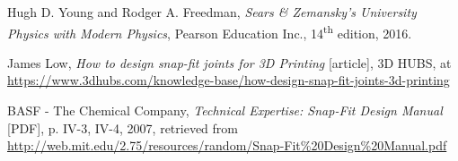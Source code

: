 \newpage

\begin{thebibliography}{9}


  Hugh D. Young and Rodger A. Freedman,
  \textit{Sears \& Zemansky's University Physics with Modern Physics},
  Pearson Education Inc.,
  14\textsuperscript{th} edition,
  2016.

  James Low,
  \textit{How to design snap-fit joints for 3D Printing} [article],
  3D HUBS,
  at \url{https://www.3dhubs.com/knowledge-base/how-design-snap-fit-joints-3d-printing}

  BASF - The Chemical Company,
  \textit{Technical Expertise: Snap-Fit Design Manual} [PDF],
  p. IV-3, IV-4,
  2007, retrieved from \url{http://web.mit.edu/2.75/resources/random/Snap-Fit\%20Design\%20Manual.pdf}

\end{thebibliography}
